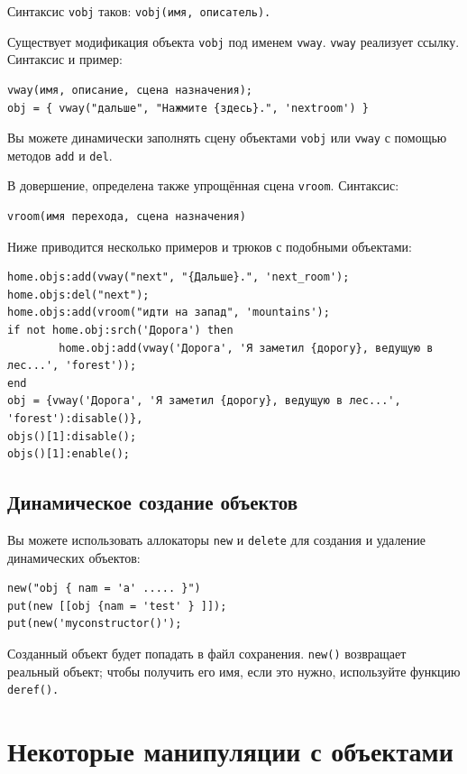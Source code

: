 \documentclass[a4paper,12pt]{article}
\begin{document}
Синтаксис \verb/vobj/ таков: \verb/vobj(имя, описатель)./

Существует модификация объекта \verb/vobj/ под именем \verb/vway/. \verb/vway/ реализует ссылку. Синтаксис и пример:

\begin{verbatim}
vway(имя, описание, сцена назначения);
obj = { vway("дальше", "Нажмите {здесь}.", 'nextroom') }
\end{verbatim}

Вы можете динамически заполнять сцену объектами \verb/vobj/ или \verb/vway/ с помощью методов \verb/add/ и \verb/del/.

В довершение, определена также упрощённая сцена \verb/vroom/. Синтаксис:

\begin{verbatim}
vroom(имя перехода, сцена назначения)
\end{verbatim}

Ниже приводится несколько примеров и трюков с подобными объектами:

\begin{verbatim}
home.objs:add(vway("next", "{Дальше}.", 'next_room');
home.objs:del("next");
home.objs:add(vroom("идти на запад", 'mountains');
if not home.obj:srch('Дорога') then
        home.obj:add(vway('Дорога', 'Я заметил {дорогу}, ведущую в лес...', 'forest'));
end
obj = {vway('Дорога', 'Я заметил {дорогу}, ведущую в лес...', 'forest'):disable()},
objs()[1]:disable();
objs()[1]:enable();
\end{verbatim}

\subsection{Динамическое создание объектов}
Вы можете использовать аллокаторы \verb/new/ и \verb/delete/ для создания и удаление динамических объектов:

\begin{verbatim}
new("obj { nam = 'a' ..... }")
put(new [[obj {nam = 'test' } ]]);
put(new('myconstructor()');
\end{verbatim}

Созданный объект будет попадать в файл сохранения. \verb/new()/ возвращает реальный объект; чтобы получить его имя, если это нужно, используйте функцию  \verb/deref()./

\section{Некоторые манипуляции с объектами}
\end{document}
